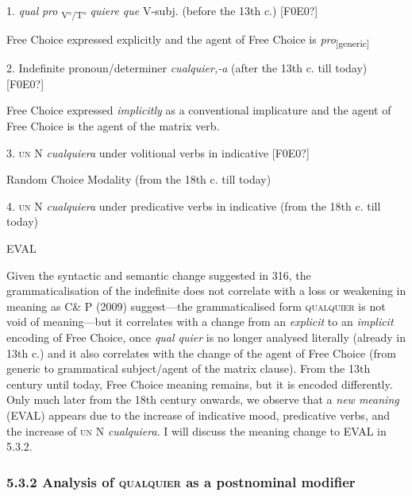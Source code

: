 \documentclass[output=paper]{langscibook}
\begin{document}
  1.  \textit{qual} \textit{pro} \textsubscript{V°/T°} \textit{quiere que} V-subj. (before the 13th c.) [F0E0?]

    Free Choice expressed explicitly and the agent of Free Choice is \textit{pro}\textsubscript{[generic]}

\begin{styleListParagraph}
\textmd{} 2.\textmd{  Indefinite pronoun/determiner} \textmd{\textit{cualquier,-a}}\textmd{ (after the 13th c. till today) [F0E0?]}
\end{styleListParagraph}

\begin{styleListParagraph}
\textmd{    Free Choice expressed} \textmd{\textit{implicitly}}\textmd{ as a conventional implicature and the agent of Free Choice is the agent of the matrix verb.}
\end{styleListParagraph}

  3.  \textsc{un} N \textit{cualquiera} under volitional verbs in indicative [F0E0?]

\begin{styleListParagraph}
\textmd{    Random Choice Modality (from the 18th c. till today)}
\end{styleListParagraph}

  4.  \textsc{un} N \textit{cualquiera} under predicative verbs in indicative (from the 18th c. till today)

EVAL

Given the syntactic and semantic change suggested in 316, the grammaticalisation of the indefinite does not correlate with a loss or weakening in meaning as C\& P (2009) suggest—the grammaticalised form \textsc{qualquier} is not void of meaning—but it correlates with a change from an \textit{explicit} to an \textit{implicit} encoding of Free Choice, once \textit{qual quier} is no longer analysed literally (already in 13th c.) and it also correlates with the change of the agent of Free Choice (from generic to grammatical subject/agent of the matrix clause). From the 13th century until today, Free Choice meaning remains, but it is encoded differently. Only much later from the 18th century onwards, we observe that a \textit{new meaning} (EVAL) appears due to the increase of indicative mood, predicative verbs, and the increase of \textsc{un} N \textit{cualquiera}. I will discuss the meaning change to EVAL in 5.3.2.

\subsubsection{\textbf{5.3.2} \textbf{Analysis} \textbf{of} \textbf{\textsc{qualquier}} \textbf{as} \textbf{a} \textbf{postnominal} \textbf{modifier}}
\end{document}
